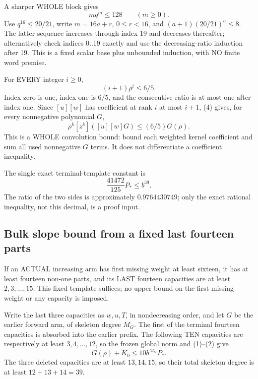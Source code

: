 \documentclass[11pt]{article}
\begin{document}
A sharper WHOLE block gives
\[
                      m q^m\le128\qquad(m\ge0).       \tag{3}
\]
Use $q^{16}\le20/21$, write $m=16a+r$, $0\le r<16$, and
$(a+1)(20/21)^a\le8$. The latter sequence increases through index 19
and decreases thereafter; alternatively check indices 0..19 exactly
and use the decreasing-ratio induction after 19. This is a fixed
scalar base plus unbounded induction, with NO finite word premise.

For EVERY integer $i\ge0$,
\[
                       (i+1)\rho^i\le6/5.             \tag{4}
\]
Index zero is one, index one is $6/5$, and the consecutive ratio is
at most one after index one. Since $[u][w]$ has coefficient at rank
$i$ at most $i+1$, (4) gives, for every nonnegative polynomial $G$,
\[
              \rho^k[z^k]([u][w]G)\le(6/5)G(\rho).   \tag{5}
\]
This is a WHOLE convolution bound: bound each weighted kernel
coefficient and sum all used nonnegative $G$ terms. It does not
differentiate a coefficient inequality.

The single exact terminal-template constant is
\[
                \frac{41472}{125}P_*\le b^{39}.        \tag{6}
\]
The ratio of the two sides is approximately $0.9764430749$;
only the exact rational inequality, not this decimal, is a proof input.

\subsection{Bulk slope bound from a fixed last fourteen parts}
If an ACTUAL increasing arm has first missing weight at least sixteen,
it has at least fourteen non-one parts, and its LAST fourteen capacities
are at least $2,3,\ldots,15$. This fixed template suffices; no upper
bound on the first missing weight or any capacity is imposed.

Write the last three capacities as $w,u,T$, in nondecreasing order,
and let $G$ be the earlier forward arm, of skeleton degree $M_G$.
The first of the terminal fourteen capacities is absorbed into the
earlier prefix. The following TEN capacities are respectively at least
$3,4,\ldots,12$, so the frozen global norm and (1)--(2) give
\[
                       G(\rho)+K_0\le10b^{M_G}P_*.
                                                               \tag{7}
\]
The three deleted capacities are at least $13,14,15$, so their total
skeleton degree is at least $12+13+14=39$.
\end{document}

